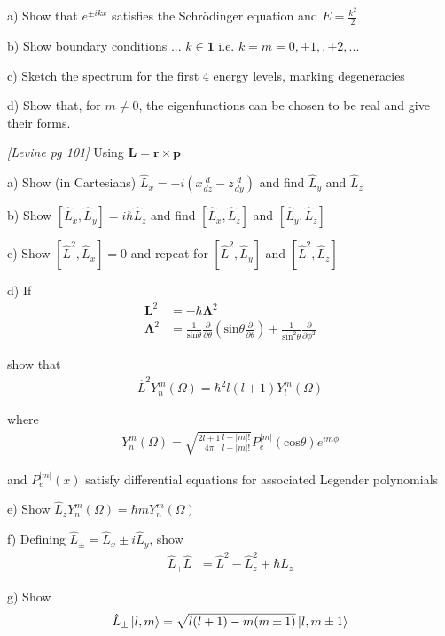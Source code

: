 a) Show that $e^{\pm ikx}$ satisfies the Schr{\"o}dinger equation and $E=\frac{k^2}{2}$

b) Show boundary conditions ... $k\in\mathbf{1}$ i.e. $k=m=0,\pm1,,\pm2,...$

c) Sketch the spectrum for the first 4 energy levels, marking degeneracies

d) Show that, for $m\neq0$, the eigenfunctions can be chosen to be real
and give their forms.

\newpage
{}
{\em [Levine pg 101]}
Using $\mathbf{L} = \mathbf{r} \times \mathbf{p}$

a) Show (in Cartesians) $\hat{L}_x = -i(x\frac{d}{dz}-z\frac{d}{dy})$ and find
$\hat{L}_y$ and $\hat{L}_z$

b) Show $[\hat{L}_x,\hat{L}_y]=i\hbar \hat{L}_z$ and find $[\hat{L}_x,\hat{L}_z]$
and $[\hat{L}_y,\hat{L}_z]$

c) Show $[\hat{L}^2,\hat{L}_x] = 0$ and repeat for $[\hat{L}^2,\hat{L}_y]$
and $[\hat{L}^2,\hat{L}_z]$

d) If
\begin{align*}
\mathbf{L}^2 & = -\hbar\mathbf{\Lambda}^2 \\
\mathbf{\Lambda}^2 & = \frac{1}{\text{sin}\theta} \frac{\partial}{\partial\theta}(\text{sin}\theta\frac{\partial}{\partial\theta})
            + \frac{1}{\text{sin}^2\theta}\frac{\partial}{\partial \phi^2}
\end{align*}

show that
\begin{align*}
\hat{L}^2Y^m_n(\Omega) = \hbar^2l(l+1)Y^m_l(\Omega)
\end{align*}

where
\begin{align*}
Y^m_n(\Omega) = \sqrt{\frac{2l+1}{4\pi}\frac{l-|m|!}{l+|m|!}}
            P^{|m|}_e(\text{cos}\theta)e^{im\phi}
\end{align*}

and $P^{|m|}_e(x)$ satisfy differential equations for associated Legender
polynomials

e) Show $\hat{L}_zY^m_n(\Omega) = \hbar m Y^m_n(\Omega)$

f) Defining $\hat{L}_{\pm} = \hat{L}_x \pm i\hat{L}_y$, show
\begin{align*}
\hat{L}_+\hat{L}_- = \hat{L}^2 - \hat{L}^2_z + \hbar\hat{L}_z
\end{align*}

g) Show
\begin{align*}
\hat{L}_{\pm}\ket{l,m} = \sqrt{l(l+1)-m(m\pm1)}\ket{l,m\pm1}
\end{align*}

